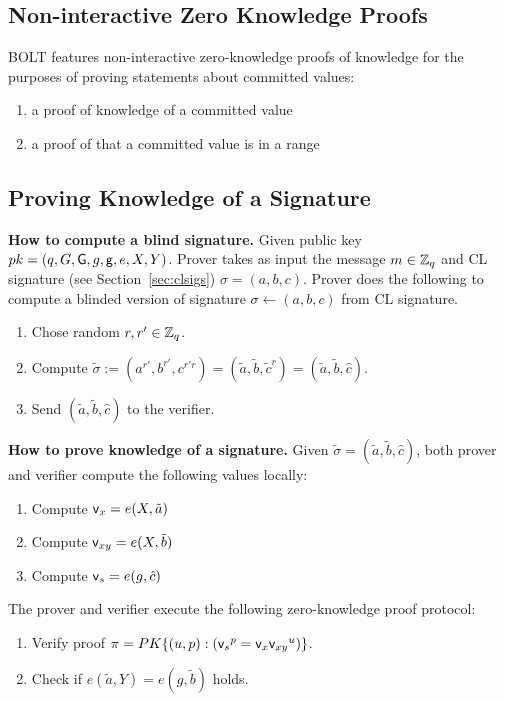 \documentclass[11pt]{report}
\begin{document}
\subsection{Non-interactive Zero Knowledge Proofs}
\label{sec:nizkp}

BOLT features non-interactive zero-knowledge proofs of knowledge for the purposes of proving statements  about committed values: 
\begin{enumerate}
\item a proof of knowledge of a committed value
\item a proof of that a committed value is in a range
\end{enumerate}

\subsection{Proving Knowledge of a Signature~\cite{CL04}}
\label{sec:blindsigs}

\noindent
{\bf How to compute a blind signature.} Given public key $pk = (q, G, {\sf G}, g, {\sf g}, e, X, Y)$. Prover takes as input the message $m \in \mathbb{Z}_q$ and CL signature (see Section~\ref{sec:clsigs}) $\sigma = (a, b, c)$.
Prover does the following to compute a blinded version of signature $\sigma \leftarrow (a, b, c)$ from CL signature.
\begin{enumerate}
\item Chose random $r, r' \in \mathbb{Z}_q$.
\item Compute $\tilde{\sigma} := (a^{r'}, b^{r'}, c^{r' r}) = (\tilde{a}, \tilde{b}, \tilde{c}^r) = (\tilde{a}, \tilde{b}, \hat{c})$.
\item Send $(\tilde{a}, \tilde{b}, \hat{c})$ to the verifier.
\end{enumerate}

\noindent
{\bf How to prove knowledge of a signature.} Given $\tilde{\sigma} = (\tilde{a}, \tilde{b}, \hat{c})$, both prover and verifier compute the following values locally:
\begin{enumerate}
\item Compute ${\sf v}_x = e(X, \tilde{a})$
\item Compute ${\sf v}_{xy} = e(X, \tilde{b})$
\item Compute ${\sf v}_s = e(g, \hat{c})$
\end{enumerate}

\noindent
The prover and verifier execute the following zero-knowledge proof protocol: 
\begin{enumerate}
\item Verify proof $\pi = PK\{(u, p) : ({{\sf v}_s}^p = {{\sf v}_x} {{\sf v}_{xy}}^u)\}$.
\item Check if $e(\tilde{a}, Y) = e(g, \tilde{b})$ holds.
\end{enumerate}
\end{document}

